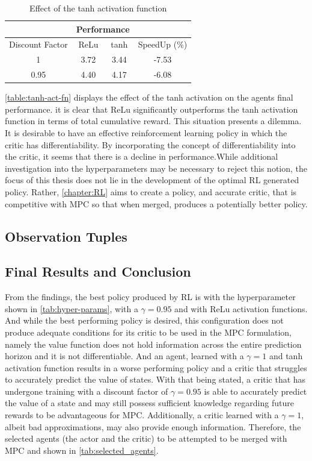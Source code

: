 \begin{table}[h!]
\centering
\begin{tabular}{|c|c|c|c|}
\hline
   & \multicolumn{2}{c|}{Performance} & \\
   \hline
  Discount Factor & ReLu & tanh & SpeedUp (\%) \\
\hline
  1   & 3.72 & 3.44 & -7.53 \\
\hline
0.95 & 4.40& 4.17& -6.08 \\
\hline
\end{tabular}
\caption{Effect of the tanh activation function}
\label{table:tanh-act-fn}
\end{table}

\autoref{table:tanh-act-fn} displays the effect of the tanh activation on the agents final performance. it is clear that ReLu significantly outperforms the tanh activation function in terms of total cumulative reward. This situation presents a dilemma. It is desirable to have an effective reinforcement learning policy in which the critic has differentiability. By incorporating the concept of differentiability into the critic, it seems that there is a decline in performance.While additional investigation into the hyperparameters may be necessary to reject this notion,  the focus of this thesis does not lie in the development of the optimal RL generated policy. Rather, \autoref{chapter:RL} aims to create a policy, and accurate critic, that is competitive with MPC so that when merged, produces a potentially better policy.

\subsection{Observation Tuples}


\subsection{Final Results and Conclusion}
\label{section:rl-deterministic-results}
From the findings, the best policy produced by RL is with the hyperparameter shown in \autoref{tab:hyper-params}, with a $\gamma = 0.95$ and with ReLu activation functions. And while the best performing policy is desired, this configuration does not produce adequate conditions for its critic to be used in the MPC formulation, namely the value function does not hold information across the entire prediction horizon and it is not differentiable. And an agent, learned with a $\gamma = 1$ and tanh activation function results in a worse performing policy and a critic that struggles to accurately predict the value of states. With that being stated, a critic that has undergone training with a discount factor of $\gamma = 0.95$ is able to accurately predict the value of a state and may still possess sufficient knowledge regarding future rewards to be advantageous for MPC. Additionally, a critic learned with a $\gamma = 1$, albeit bad approximations, may also provide enough information. Therefore, the selected agents (the actor and the critic) to be attempted to be merged with MPC and shown in \autoref{tab:selected_agents}. 

